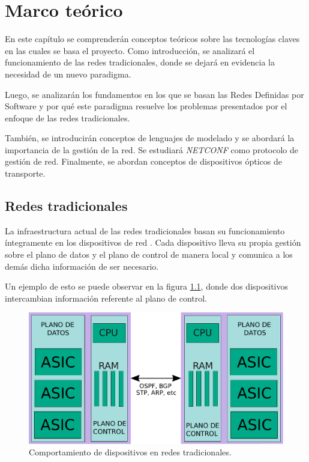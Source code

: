 \chapter{Marco teórico} %

\label{Chapter2} %
En este capítulo se comprenderán conceptos teóricos sobre las tecnologías claves en las cuales se basa el proyecto. Como introducción, se analizará el funcionamiento de las redes tradicionales, donde se dejará en evidencia la necesidad de un nuevo paradigma. 

Luego, se analizarán los fundamentos en los que se basan las Redes Definidas por Software y por qué este paradigma resuelve los problemas presentados por el enfoque de las redes tradicionales. 

También, se introducirán conceptos de lenguajes de modelado y se abordará la importancia de la gestión de la red. Se estudiará \textit{NETCONF} como protocolo de gestión de red. Finalmente, se abordan conceptos de dispositivos ópticos de transporte.

\section{Redes tradicionales} \label{sec:rdtr}

La infraestructura actual de las redes tradicionales basan su funcionamiento íntegramente en los dispositivos de red \parencite{ISACA}. Cada dispositivo lleva su propia gestión sobre el plano de datos y el plano de control de manera local y comunica a los demás dicha información de ser necesario. 

Un ejemplo de esto se puede observar en la figura \ref{fig:dev_tradicional}, donde dos dispositivos intercambian información referente al plano de control.


\begin{figure}[H]
	\centering
	\includegraphics[scale=0.60]{Figures/dispositivo-tradicional.pdf}
	\caption{Comportamiento de dispositivos en redes tradicionales.}
	\label{fig:dev_tradicional}
  \end{figure}


